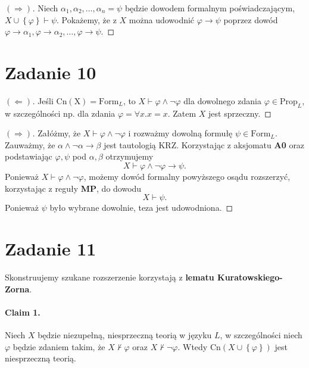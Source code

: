 \begin{proof}[\( (\Rightarrow) \)]
    Niech \( \alpha_1, \alpha_2, \ldots, \alpha_n = \psi \) będzie dowodem formalnym poświadczającym, \( X \cup \left\{ \varphi \right\} \vdash \psi \). Pokażemy, że z \( X \) można udowodnić \( \varphi \to \psi \) poprzez dowód \( \varphi \to \alpha_1, \varphi \to \alpha_2, \ldots, \varphi \to \psi \).
\end{proof}

\section*{Zadanie 10}

\begin{proof}[\((\Leftarrow)\)]
    Jeśli \( \mathrm{Cn(X)} = \mathrm{Form}_L \), to \( X \vdash \varphi \wedge \neg\varphi \) dla dowolnego zdania \( \varphi \in \mathrm{Prop}_L \), w szczególności np. dla zdania \( \varphi = \forall x. x = x \). Zatem \( X \) jest sprzeczny.
\end{proof}

\begin{proof}[\( (\Rightarrow) \)]
Załóżmy, że \( X \vdash \varphi \wedge \neg \varphi \) i rozważmy dowolną formułę \( \psi \in \mathrm{Form}_L \).
Zauważmy, że \( \alpha \wedge \neg \alpha \to \beta \) jest tautologią KRZ. Korzystając z aksjomatu \textbf{A0} oraz podstawiając \( \varphi, \psi \) pod \( \alpha, \beta \) otrzymujemy
\[ 
    X \vdash \varphi \wedge \neg \varphi \to \psi.
\]
Ponieważ \( X \vdash \varphi \wedge \neg \varphi \), możemy dowód formalny powyższego osądu rozszerzyć, korzystając z reguły \textbf{MP}, do dowodu
\[ 
    X \vdash \psi. 
\]
Ponieważ \( \psi \) było wybrane dowolnie, teza jest udowodniona.
\end{proof}

\section*{Zadanie 11}

Skonstruujemy szukane rozszerzenie korzystają z \textbf{lematu Kuratowskiego-Zorna}. 

\paragraph{Claim 1.} Niech \( X \) będzie niezupełną, niesprzeczną teorią w języku \( L \), w szczególności niech \( \varphi \) będzie zdaniem takim, że \( X \not\vdash \varphi \) oraz \( X \not\vdash \neg\varphi \). Wtedy \( \mathrm{Cn}(X \cup \left\{ \varphi \right\}) \) jest niesprzeczną teorią.

